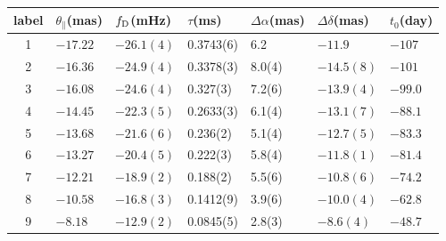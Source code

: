 \documentclass[useAMS,usenatbib]{mn2e}
\begin{document}
\begin{table}
\centering
\begin{tabular}{c|llllll}
\hline
label & $\theta_{\parallel}$(mas) & $f_{\rm D}$(mHz) & $\tau$(ms)  & $\Delta\alpha$(mas) & $\Delta\delta$(mas) & $t_0$(day)\\
\hline
1& $-17.22$   & $-26.1(4)$    & 0.3743(6)         & 6.2    & $-11.9$      & $-107$                               \\
2& $-16.36$  & $-24.9(4)$      & 0.3378(3)         & 8.0(4)  & $-14.5(8)$      &$-101$                                \\
3& $-16.08$   & $-24.6(4)$       & 0.327(3)   & 7.2(6)  & $-13.9(4)$       & $-99.0$                                \\
4& $-14.45$   & $-22.3(5)$      & 0.2633(3)    & 6.1(4)  & $-13.1(7)$     & $-88.1$                                \\
5& $-13.68$ & $-21.6(6)$        & 0.236(2)    & 5.1(4)  & $-12.7(5)$      & $-83.3$                                \\
6& $-13.27$ & $-20.4(5)$      & 0.222(3)     & 5.8(4)  & $-11.8(1)$    & $-81.4$                                \\
7& $-12.21$   & $-18.9(2)$      & 0.188(2)   & 5.5(6) & $-10.8(6)$      & $-74.2$                        \\
8& $-10.58$   & $-16.8(3)$      & 0.1412(9)  & 3.9(6) & $-10.0(4)$      & $-62.8$                                \\
9& $-8.18$   & $-12.9(2)$      & 0.0845(5) & 2.8(3)  & $-8.6(4)$      & $-48.7$                                
\\ \hline


\end{tabular}
\end{table}
\end{document}
